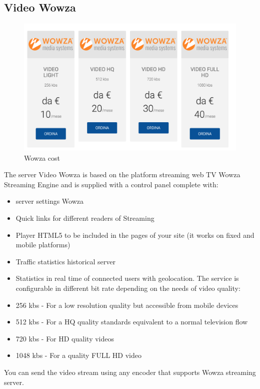 \subsection{Video Wowza}
\label{sec:Video Wowza}
\begin{figure}[!htb]
 \centering
 \includegraphics[width=1.0\linewidth]{images/chapter2/wowza.png}\hfill
 \caption[Wowza cost]{Wowza cost}
 \label{fig:fourV}
\end{figure}

 The server Video Wowza is based on the platform streaming web TV Wowza Streaming Engine and is supplied with a control panel complete with:
\begin{itemize}

\item server settings Wowza
\item Quick links for different readers of Streaming
\item Player HTML5 to be included in the pages of your site (it works on fixed and mobile platforms)
\item Traffic statistics historical server
\item Statistics in real time of connected users with geolocation. The service is configurable in different bit rate depending on the needs of video quality:
\item 256 kbs - For a low resolution quality but accessible from mobile devices
\item 512 kbs - For a HQ quality standards equivalent to a normal television flow
\item 720 kbs - For HD quality videos
\item 1048 kbs - For a quality FULL HD video
\end{itemize}

You can send the video stream using any encoder that supports Wowza streaming server.



